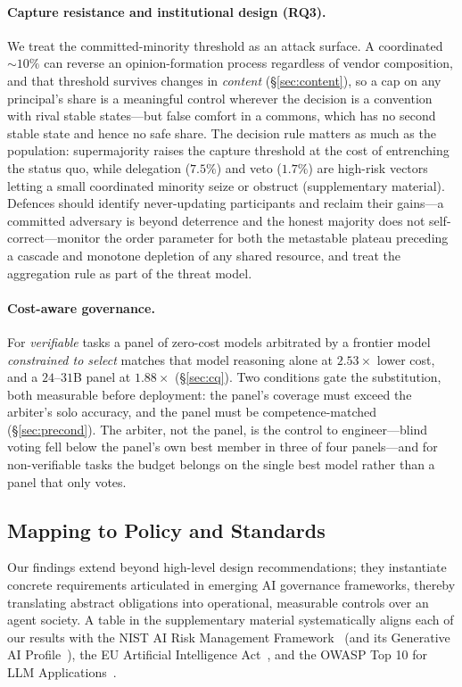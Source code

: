 \documentclass[manuscript,screen,review]{acmart}
\begin{document}
\paragraph{Capture resistance and institutional design (RQ3).} We treat the
committed-minority threshold as an attack surface. A coordinated $\sim10\%$ can
reverse an opinion-formation process regardless of vendor composition, and that
threshold survives changes in \emph{content} (\S\ref{sec:content}), so a cap on any
principal's share is a meaningful control wherever the decision is a convention with
rival stable states---but false comfort in a commons, which has no second stable
state and hence no safe share. The decision rule matters as much as the population:
supermajority raises the capture threshold at the cost of entrenching the status
quo, while delegation ($7.5\%$) and veto ($1.7\%$) are high-risk vectors letting a
small coordinated minority seize or obstruct (supplementary material). Defences should
identify never-updating participants and reclaim their gains---a committed adversary
is beyond deterrence and the honest majority does not self-correct---monitor the
order parameter for both the metastable plateau preceding a cascade and monotone
depletion of any shared resource, and treat the aggregation rule as part of the
threat model.

\paragraph{Cost-aware governance.} For \emph{verifiable} tasks a panel of zero-cost
models arbitrated by a frontier model \emph{constrained to select} matches that
model reasoning alone at $2.53\times$ lower cost, and a $24$--$31$B panel at
$1.88\times$ (\S\ref{sec:cq}). Two conditions gate the substitution, both measurable
before deployment: the panel's coverage must exceed the arbiter's solo accuracy, and
the panel must be competence-matched (\S\ref{sec:precond}). The arbiter, not the
panel, is the control to engineer---blind voting fell below the panel's own best
member in three of four panels---and for non-verifiable tasks the budget belongs on
the single best model rather than a panel that only votes.

\subsection{Mapping to Policy and Standards}
\label{sec:policy}
Our findings extend beyond high-level design recommendations; they instantiate concrete requirements articulated in emerging AI governance frameworks, thereby translating abstract obligations into operational, measurable controls over an agent society. A table in the supplementary material systematically aligns each of our results with the NIST AI Risk Management Framework~\cite{nist_airmf} (and its Generative AI Profile~\cite{nist_genai}), the EU Artificial Intelligence Act~\cite{eu_aiact}, and the OWASP Top 10 for LLM Applications~\cite{owasp_llm}.
\end{document}
